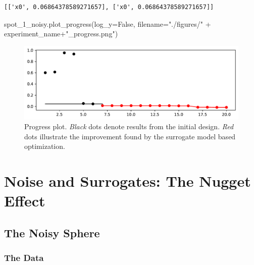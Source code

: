 \documentclass[
  letterpaper,
  DIV=11,
  numbers=noendperiod]{scrreprt}
\newenvironment{Shaded}{\begin{snugshade}}{\end{snugshade}}
\newcommand{\NormalTok}[1]{\textcolor[rgb]{0.00,0.23,0.31}{#1}}
\newcommand{\OperatorTok}[1]{\textcolor[rgb]{0.37,0.37,0.37}{#1}}
\newcommand{\StringTok}[1]{\textcolor[rgb]{0.13,0.47,0.30}{#1}}
\newcommand{\VariableTok}[1]{\textcolor[rgb]{0.07,0.07,0.07}{#1}}
\begin{document}
\begin{verbatim}
[['x0', 0.06864378589271657], ['x0', 0.06864378589271657]]
\end{verbatim}

\begin{Shaded}
\begin{Highlighting}[]
\NormalTok{spot\_1\_noisy.plot\_progress(log\_y}\OperatorTok{=}\VariableTok{False}\NormalTok{,}
\NormalTok{    filename}\OperatorTok{=}\StringTok{"./figures/"} \OperatorTok{+}\NormalTok{ experiment\_name}\OperatorTok{+}\StringTok{"\_progress.png"}\NormalTok{)}
\end{Highlighting}
\end{Shaded}

\begin{figure}[H]

{\centering \includegraphics{08_spot_noisy_files/figure-pdf/cell-8-output-1.pdf}

}

\caption{Progress plot. \emph{Black} dots denote results from the
initial design. \emph{Red} dots illustrate the improvement found by the
surrogate model based optimization.}

\end{figure}

\hypertarget{noise-and-surrogates-the-nugget-effect}{%
\section{Noise and Surrogates: The Nugget
Effect}\label{noise-and-surrogates-the-nugget-effect}}

\hypertarget{the-noisy-sphere}{%
\subsection{The Noisy Sphere}\label{the-noisy-sphere}}

\hypertarget{the-data}{%
\subsubsection{The Data}\label{the-data}}
\end{document}
